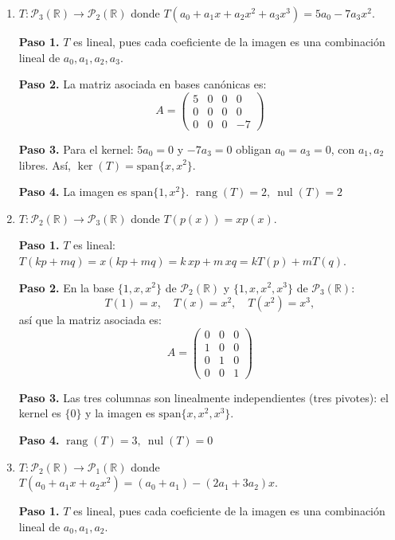 \begin{prob}
\begin{enumerate}[$a)$]
\begin{myproof}
\textbf{Paso 2.} $\boxed{T \text{ no es transformación lineal}}$
\end{myproof}

\item $T:\mathcal{P}_{3}(\mathbb{R}) \rightarrow \mathcal{P}_{2}(\mathbb{R})$ donde $T(a_0+a_1x+a_2x^2+a_3x^3)= 5a_0-7a_3x^2.$
\begin{myproof}
\textbf{Paso 1.} $T$ es lineal, pues cada coeficiente de la imagen es una combinación lineal de $a_0, a_1, a_2, a_3$.

\textbf{Paso 2.} La matriz asociada en bases canónicas es:
\[
A = \begin{pmatrix}
5 & 0 & 0 & 0 \\
0 & 0 & 0 & 0 \\
0 & 0 & 0 & -7
\end{pmatrix}
\]

\textbf{Paso 3.} Para el kernel: $5a_0 = 0$ y $-7a_3 = 0$ obligan $a_0 = a_3 = 0$, con $a_1, a_2$ libres. Así, $\ker(T) = \text{span}\{x, x^2\}$.

\textbf{Paso 4.} La imagen es $\text{span}\{1, x^2\}$. $\boxed{\operatorname{rang}(T)=2,\ \operatorname{nul}(T)=2}$
\end{myproof}

\item $T:\mathcal{P}_{2}(\mathbb{R}) \rightarrow \mathcal{P}_{3}(\mathbb{R})$ donde $T(p(x))=xp(x).$
\begin{myproof}
\textbf{Paso 1.} $T$ es lineal: $T(kp + mq) = x(kp + mq) = k\,xp + m\,xq = kT(p) + mT(q)$.

\textbf{Paso 2.} En la base $\{1, x, x^2\}$ de $\mathcal{P}_2(\mathbb{R})$ y $\{1, x, x^2, x^3\}$ de $\mathcal{P}_3(\mathbb{R})$:
\[
T(1) = x, \quad T(x) = x^2, \quad T(x^2) = x^3,
\]
así que la matriz asociada es:
\[
A = \begin{pmatrix}
0 & 0 & 0 \\
1 & 0 & 0 \\
0 & 1 & 0 \\
0 & 0 & 1
\end{pmatrix}
\]

\textbf{Paso 3.} Las tres columnas son linealmente independientes (tres pivotes): el kernel es $\{0\}$ y la imagen es $\text{span}\{x, x^2, x^3\}$.

\textbf{Paso 4.} $\boxed{\operatorname{rang}(T)=3,\ \operatorname{nul}(T)=0}$
\end{myproof}

\item $T:\mathcal{P}_{2}(\mathbb{R}) \rightarrow \mathcal{P}_{1}(\mathbb{R})$ donde $T(a_0+a_1x+a_2x^2) =(a_0+a_1)-(2a_1+3a_2)x.$
\begin{myproof}
\textbf{Paso 1.} $T$ es lineal, pues cada coeficiente de la imagen es una combinación lineal de $a_0, a_1, a_2$.


\end{myproof}
\end{enumerate}
\end{prob}
